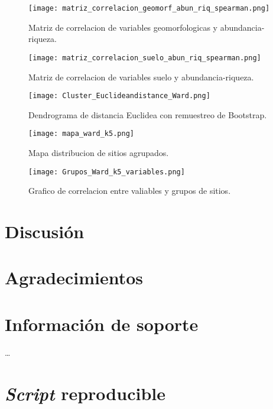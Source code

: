 \documentclass[11pt,]{article}
\begin{document}
\begin{figure}
\centering
\texttt{[image: matriz\_correlacion\_geomorf\_abun\_riq\_spearman.png]}
\caption{Matriz de correlacion de variables geomorfologicas y
abundancia-riqueza.
\label{fig:matriz_correlacion_geomorf_abun_riq_spearman}}
\end{figure}

\begin{figure}
\centering
\texttt{[image: matriz\_correlacion\_suelo\_abun\_riq\_spearman.png]}
\caption{Matriz de correlacion de variables suelo y abundancia-riqueza.
\label{fig:matriz_correlacion_suelo_abun_riq_spearman}}
\end{figure}

\begin{figure}
\centering
\texttt{[image: Cluster\_Euclideandistance\_Ward.png]}
\caption{Dendrograma de distancia Euclidea con remuestreo de Bootstrap.
\label{fig:Cluster_Euclideandistance_Ward}}
\end{figure}

\begin{figure}
\centering
\texttt{[image: mapa\_ward\_k5.png]}
\caption{Mapa distribucion de sitios agrupados.
\label{fig:mapa_ward_k5}}
\end{figure}

\begin{figure}
\centering
\texttt{[image: Grupos\_Ward\_k5\_variables.png]}
\caption{Grafico de correlacion entre valiables y grupos de sitios.
\label{fig:Grupos_Ward_k5_variables}}
\end{figure}

\section{Discusión}\label{discusiuxf3n}

\section{Agradecimientos}\label{agradecimientos}

\section{Información de soporte}\label{informaciuxf3n-de-soporte}

\ldots

\section{\texorpdfstring{\emph{Script}
reproducible}{Script reproducible}}\label{script-reproducible}
\end{document}

